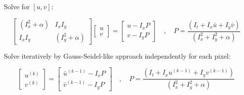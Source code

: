 \documentclass{article}
\begin{document}
\begin{multicols}{2}
	Solve for \([u, v]\):

	\[
		\begin{bmatrix}
			(I_x^2 + \alpha) & I_x I_y          \\
			I_x I_y          & (I_y^2 + \alpha)
		\end{bmatrix}
		\begin{bmatrix}
			u \\
			v
		\end{bmatrix}
		=
		\begin{bmatrix}
			u - I_x P \\
			v - I_y P
		\end{bmatrix}
		\quad , \quad P = \frac{(I_t + I_x \bar{u} + I_y \bar{v})}{(I_x^2 + I_y^2 + \alpha)}
	\]

	Solve iteratively by Gauss-Seidel-like approach independently for each pixel:

	\[
		\begin{bmatrix}
			u^{(k)} \\
			v^{(k)}
		\end{bmatrix}
		=
		\begin{bmatrix}
			\bar{u}^{(k-1)} - I_x P \\
			\bar{v}^{(k-1)} - I_y P
		\end{bmatrix}
		\quad , \quad P = \frac{(I_t + I_x u^{(k-1)} + I_y v^{(k-1)})}{(I_x^2 + I_y^2 + \alpha)}
	\]




\end{multicols}
\end{document}
